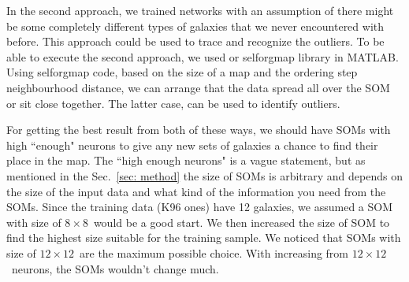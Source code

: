    In the second approach, we trained networks with an assumption of there might be some completely different types of galaxies that we never encountered with before.
    This approach could be used to trace and recognize the outliers.
    To be able to execute the second approach, we used or {\tiny selforgmap} library in {\tiny MATLAB}.
    Using {\tiny selforgmap} code, based on the size of a map and the ordering step neighbourhood distance, we can arrange that the data spread all over the SOM or sit close together.
    The latter case, can be used to identify outliers. 

    For getting the best result from both of these ways, we should have SOMs with high ``enough"  neurons to give any new sets of galaxies a chance to find their place in the map.
    The  ``high enough  neurons" is a vague statement, but as mentioned in the Sec.~\ref{sec: method} the size of SOMs is arbitrary and depends on the size of the input data and what kind of the information you need from the SOMs. %
    Since the training data (K96 ones) have 12 galaxies, we assumed a SOM with size of $8\times8$~would be a good start.
    We then increased the size of SOM to find the highest size suitable for the training sample.
    We noticed that SOMs with size of $12\times12$~are the maximum possible choice.
    With increasing from $12\times12$~neurons, the SOMs wouldn't change much.
    
